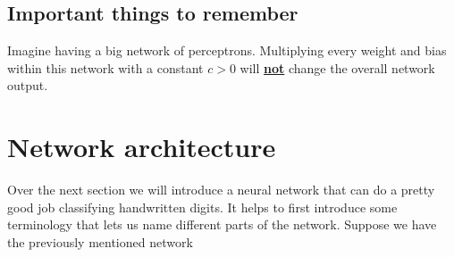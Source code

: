 \documentclass[10pt]{book}
\begin{document}
    \subsection{Important things to remember}
    Imagine having a big network of perceptrons. Multiplying every weight and bias within this network with a constant \(c > 0\) will \underline{\textbf{not}} change the overall network output.

    \section{Network architecture}
    Over the next section we will introduce a neural network that can do a pretty good job classifying handwritten digits. It helps to first introduce some terminology
    that lets us name different parts of the network.
    Suppose we have the previously mentioned network
\end{document}
